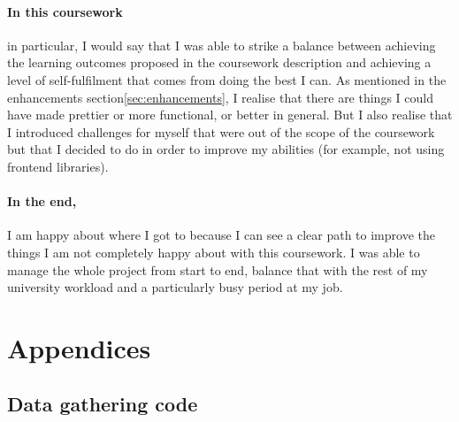 \documentclass[10pt, a4paper]{article}
\begin{document}
        \paragraph{In this coursework} in particular, I would say that I was able to strike a balance between achieving the learning outcomes proposed in the coursework description and achieving a level of self-fulfilment that comes from doing the best I can. As mentioned in the enhancements section\ref{sec:enhancements}, I realise that there are things I could have made prettier or more functional, or better in general. But I also realise that I introduced challenges for myself that were out of the scope of the coursework but that I decided to do in order to improve my abilities (for example, not using frontend libraries).
        \paragraph{In the end,} I am happy about where I got to because I can see a clear path to improve the things I am not completely happy about with this coursework. I was able to manage the whole project from start to end, balance that with the rest of my university workload and a particularly busy period at my job.

        
        

        \section{Appendices}
        \subsection{Data gathering code}


        
\end{document}
